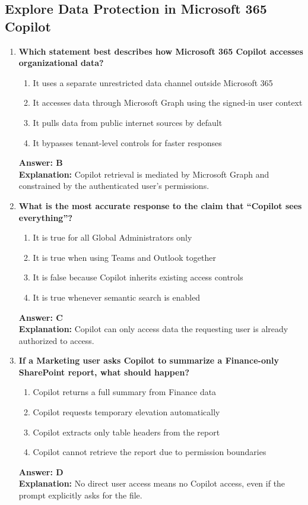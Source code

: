 \documentclass[10pt]{article}
\begin{document}
\clearpage
\subsection{Explore Data Protection in Microsoft 365 Copilot}
\begin{enumerate}[leftmargin=*]

\item \textbf{Which statement best describes how Microsoft 365 Copilot accesses organizational data?}
\begin{enumerate}[label=\Alph*.]
  \item It uses a separate unrestricted data channel outside Microsoft 365
  \item It accesses data through Microsoft Graph using the signed-in user context
  \item It pulls data from public internet sources by default
  \item It bypasses tenant-level controls for faster responses
\end{enumerate}
\textbf{Answer: B}\\
\textbf{Explanation:} Copilot retrieval is mediated by Microsoft Graph and constrained by the authenticated user’s permissions.

\item \textbf{What is the most accurate response to the claim that ``Copilot sees everything''?}
\begin{enumerate}[label=\Alph*.]
  \item It is true for all Global Administrators only
  \item It is true when using Teams and Outlook together
  \item It is false because Copilot inherits existing access controls
  \item It is true whenever semantic search is enabled
\end{enumerate}
\textbf{Answer: C}\\
\textbf{Explanation:} Copilot can only access data the requesting user is already authorized to access.

\item \textbf{If a Marketing user asks Copilot to summarize a Finance-only SharePoint report, what should happen?}
\begin{enumerate}[label=\Alph*.]
  \item Copilot returns a full summary from Finance data
  \item Copilot requests temporary elevation automatically
  \item Copilot extracts only table headers from the report
  \item Copilot cannot retrieve the report due to permission boundaries
\end{enumerate}
\textbf{Answer: D}\\
\textbf{Explanation:} No direct user access means no Copilot access, even if the prompt explicitly asks for the file.


\end{enumerate}
\end{document}
